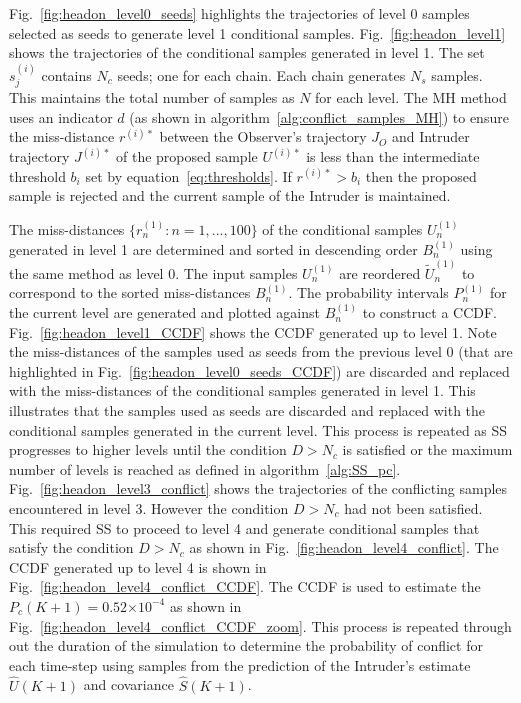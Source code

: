 \documentclass[journal]{IEEEtran}
\providecommand{\e}[1]{\ensuremath{\times 10^{#1}}}
\begin{document}
Fig.~\ref{fig:headon_level0_seeds} highlights the trajectories of level 0 samples selected as seeds to generate level 1 conditional samples. Fig.~\ref{fig:headon_level1} shows the trajectories of the conditional samples generated in level 1.
The set $s_{j}^{(i)}$ contains $N_c$ seeds; one for each chain. Each chain generates $N_s$ samples. This maintains the total number of samples as $N$ for each level. The MH method uses an indicator $d$ (as shown in algorithm~\ref{alg:conflict_samples_MH}) to ensure the miss-distance $r^{(i)*}$ between the Observer's trajectory $J_{O}$ and Intruder trajectory $J^{(i)*}$ of the proposed sample $U^{(i)*}$ is less than the intermediate threshold $b_{i}$ set by equation~\ref{eq:thresholds}. If $r^{(i)*} > b_{i}$ then the proposed sample is rejected and the current sample of the Intruder is maintained.

The miss-distances $\{r_{n}^{(1)}: n = 1,...,100\}$ of the conditional samples $U_{n}^{(1)}$ generated in level 1 are determined and sorted in descending order $B_{n}^{(1)}$ using the same method as level 0. The input samples $U_{n}^{(1)}$ are reordered $\tilde{U}_{n}^{(1)}$ to correspond to the sorted miss-distances $B_{n}^{(1)}$. The probability intervals $P_{n}^{(1)}$ for the current level are generated and plotted against $B_{n}^{(1)}$ to construct a CCDF. Fig.~\ref{fig:headon_level1_CCDF} shows the CCDF generated up to level 1. Note the miss-distances of the samples used as seeds from the previous level 0 (that are highlighted in Fig.~\ref{fig:headon_level0_seeds_CCDF}) are discarded and replaced with the miss-distances of the conditional samples generated in level 1. This illustrates that the samples used as seeds are discarded and replaced with the conditional samples generated in the current level. This process is repeated as SS progresses to higher levels until the condition $D > N_{c}$ is satisfied or the maximum number of levels is reached as defined in algorithm~\ref{alg:SS_pc}. Fig.~\ref{fig:headon_level3_conflict} shows the trajectories of the conflicting samples encountered in level 3. However the condition $D > N_{c}$ had not been satisfied. This required SS to proceed to level 4 and generate conditional samples that satisfy the condition $D > N_{c}$ as shown in Fig.~\ref{fig:headon_level4_conflict}. The CCDF generated up to level 4 is shown in Fig.~\ref{fig:headon_level4_conflict_CCDF}. The CCDF is used to estimate the $P_{c}(K+1) = 0.52\e{-4}$ as shown in Fig.~\ref{fig:headon_level4_conflict_CCDF_zoom}.
This process is repeated through out the duration of the simulation to determine the probability of conflict for each time-step using samples from the prediction of the Intruder's estimate $\hat{U}(K+1)$ and covariance $\hat{S}(K+1)$.
\end{document}
